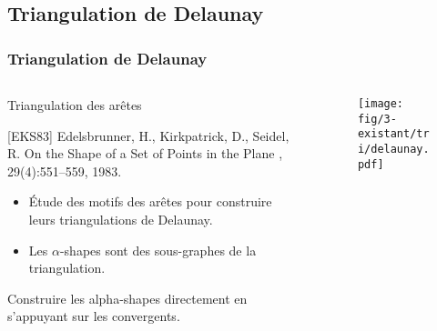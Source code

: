 \subsection{Triangulation de Delaunay}

\begin{frame}
  \frametitle{Triangulation de Delaunay}

	\begin{columns}[t]
 		\begin{column}{7cm}

			\begin{block}{Triangulation des arêtes}
\scriptsize
\begin{thebibliography}{alpha}

[EKS83] Edelsbrunner, H., Kirkpatrick, D., Seidel, R.
\newblock On the Shape of a Set of Points in the Plane
, 29(4):551--559, 1983.

\end{thebibliography}
				\begin{itemize}

					\item Étude des motifs des arêtes pour construire leurs triangulations de Delaunay.
					\item Les $\alpha$-shapes sont des sous-graphes de la triangulation. 
	      \end{itemize}	
			\end{block} 

			{
				\begin{block}{}
					\alert{Construire les alpha-shapes directement en s'appuyant sur les convergents.}
				\end{block}
			}
 		\end{column}
    \begin{column}{3cm}
			\begin{figure}[h!]
				\centering
			  \texttt{[image: fig/3-existant/tri/delaunay.pdf]}
			\end{figure}
	  \end{column}
	\end{columns}
\end{frame}
